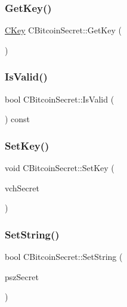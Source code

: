\subsubsection{\texorpdfstring{Get\+Key()}{GetKey()}}
{\footnotesize\ttfamily \mbox{\hyperlink{class_c_key}{C\+Key}} C\+Bitcoin\+Secret\+::\+Get\+Key (\begin{DoxyParamCaption}{ }\end{DoxyParamCaption})}

\mbox{\label{class_c_bitcoin_secret_a2a93fa8a09826ff63498cb3e4370c154}} 
\subsubsection{\texorpdfstring{Is\+Valid()}{IsValid()}}
{\footnotesize\ttfamily bool C\+Bitcoin\+Secret\+::\+Is\+Valid (\begin{DoxyParamCaption}{ }\end{DoxyParamCaption}) const}

\mbox{\label{class_c_bitcoin_secret_a3629c0fce320664c3c07cb082939d6ec}} 
\subsubsection{\texorpdfstring{Set\+Key()}{SetKey()}}
{\footnotesize\ttfamily void C\+Bitcoin\+Secret\+::\+Set\+Key (\begin{DoxyParamCaption}\item[{const \mbox{\hyperlink{class_c_key}{C\+Key}} \&}]{vch\+Secret }\end{DoxyParamCaption})}

\mbox{\label{class_c_bitcoin_secret_a6a8aff02f66099f33f573ad3e6375bb1}} 
\subsubsection{\texorpdfstring{Set\+String()}{SetString()}\hspace{0.1cm}{\footnotesize\ttfamily [1/2]}}
{\footnotesize\ttfamily bool C\+Bitcoin\+Secret\+::\+Set\+String (\begin{DoxyParamCaption}\item[{const char $\ast$}]{psz\+Secret }\end{DoxyParamCaption})}

